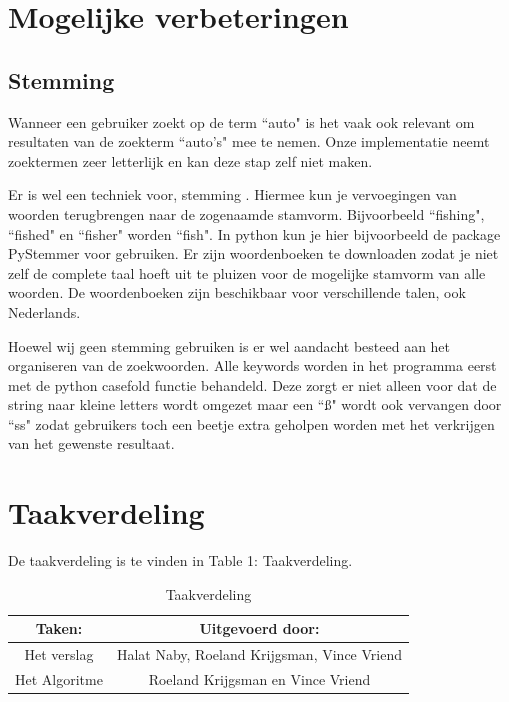 \documentclass[12pt,a4paper]{article}
\begin{document}
\section{Mogelijke verbeteringen}
\subsection{Stemming}
Wanneer een gebruiker zoekt op de term ``auto" is het vaak ook relevant om resultaten van de zoekterm ``auto's" mee te nemen. Onze implementatie neemt zoektermen zeer letterlijk en kan deze stap zelf niet maken.
\vspace{1pc}

Er is wel een techniek voor, stemming \cite{5}.  Hiermee kun je vervoegingen van woorden terugbrengen naar de zogenaamde stamvorm. Bijvoorbeeld ``fishing", ``fished" en ``fisher" worden ``fish". In python kun je hier bijvoorbeeld de package PyStemmer voor gebruiken. Er zijn woordenboeken te downloaden zodat je niet zelf de complete taal hoeft uit te pluizen voor de mogelijke stamvorm van alle woorden. De woordenboeken zijn beschikbaar voor verschillende talen, ook Nederlands.
\vspace{1pc}

Hoewel wij geen stemming gebruiken is er wel aandacht besteed aan het organiseren van de zoekwoorden. Alle keywords worden in het programma eerst met de python casefold functie behandeld. Deze zorgt er niet alleen voor dat de string naar kleine letters wordt omgezet maar een ``{\ss}" wordt ook vervangen door ``ss" zodat gebruikers toch een beetje extra geholpen worden met het verkrijgen van het gewenste resultaat.

\section{Taakverdeling}
De taakverdeling is te vinden in Table 1: Taakverdeling.

\begin{table}
\caption{Taakverdeling}
\label{taakverdling}
\begin{center}
\begin{tabular}{|c||c|}
\hline
Taken: & Uitgevoerd door:\\
\hline
Het verslag & Halat Naby, Roeland Krijgsman, Vince Vriend\\
\hline
Het Algoritme &  Roeland Krijgsman en Vince Vriend\\
\hline
\end{tabular}
\end{center}
\end{table}



\end{document}
